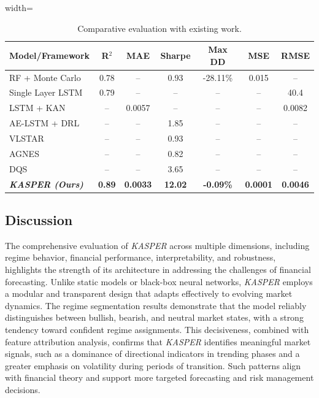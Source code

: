 \documentclass[conference,10pt]{IEEEtran}
\begin{document}
\begin{table}[htbp]
\centering
\caption{Comparative evaluation with existing work.}
\label{tab:stock_models}
\begin{adjustbox}{width=\linewidth}
\begin{tabular}{lcccccc}
\toprule
\textbf{Model/Framework} & \textbf{R$^2$} & \textbf{MAE} & \textbf{Sharpe} & \textbf{Max DD} & \textbf{MSE} & \textbf{RMSE} \\
\midrule
RF + Monte Carlo \cite{zhao2025predicting} & 0.78 & -- & 0.93 & -28.11\% & 0.015 & -- \\
Single Layer LSTM \cite{bhandari2022predicting} & 0.79 & -- & -- & -- & -- & 40.4 \\
LSTM + KAN \cite{yao2024lstm} & -- & 0.0057 & -- & -- & -- & 0.0082 \\
AE-LSTM + DRL\cite{sagiraju2022deployment} & -- & -- & 1.85 & -- & -- & -- \\
VLSTAR \cite{bucci2021market} & -- & -- & 0.93 & -- & -- & -- \\
AGNES \cite{bucci2021market} & -- & -- & 0.82 & -- & -- & -- \\
DQS \cite{li2023stock} & -- & -- & 3.65 & -- & -- & -- \\
\textbf{\textit{KASPER (Ours)}} & \textbf{0.89} & \textbf{0.0033} & \textbf{12.02} & \textbf{-0.09\%} & \textbf{0.0001} & \textbf{0.0046} \\
\bottomrule
\end{tabular}
\end{adjustbox}
\end{table}

\subsection{Discussion} 

The comprehensive evaluation of \textit{KASPER} across multiple dimensions, including regime behavior, financial performance, interpretability, and robustness, highlights the strength of its architecture in addressing the challenges of financial forecasting. Unlike static models or black-box neural networks, \textit{KASPER} employs a modular and transparent design that adapts effectively to evolving market dynamics.
The regime segmentation results demonstrate that the model reliably distinguishes between bullish, bearish, and neutral market states, with a strong tendency toward confident regime assignments. This decisiveness, combined with feature attribution analysis, confirms that \textit{KASPER} identifies meaningful market signals, such as a dominance of directional indicators in trending phases and a greater emphasis on volatility during periods of transition. Such patterns align with financial theory and support more targeted forecasting and risk management decisions.
\end{document}
